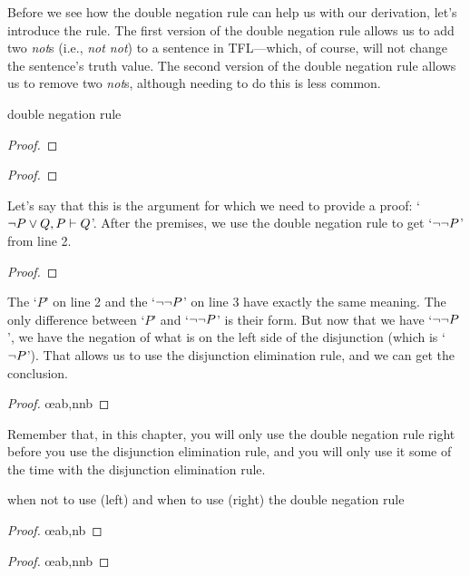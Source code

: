 Before we see how the double negation rule can help us with our derivation, let's introduce the rule. The first version of the double negation rule allows us to add two \textit{not}s (i.e., \textit{not not}) to a sentence in TFL---which, of course, will not change the sentence's truth value. The second version of the double negation rule allows us to remove two \textit{not}s, although needing to do this is less common. 

\begin{factboxy-width}[width=7.5cm]{double negation rule}
\begin{proof}
	 
\end{proof}

\begin{proof}
	 
\end{proof}
\end{factboxy-width}

Let's say that this is the argument for which we need to provide a proof: `${\neg} P \vee Q, P \vdash Q$'. After the premises, we use the double negation rule to get `${\neg} {\neg} P$' from line 2.

\begin{proof}
	 \pr{}
	 \pr{} 
	 
\end{proof}
The `$P$' on line 2 and the `${\neg} {\neg} P$' on line 3 have exactly the same meaning. The only difference between `$P$' and `${\neg} {\neg} P$' is their form. But now that we have `${\neg} {\neg} P$', we have the negation of what is on the left side of the disjunction (which is `${\neg} P$'). That allows us to use the disjunction elimination rule, and we can get the conclusion.

\begin{proof}
	 \pr{}
	 \pr{}
	 
	 \oe{ab,nnb}
\end{proof}

Remember that, in this chapter, you will only use the double negation rule right before you use the disjunction elimination rule, and you will only use it some of the time with the disjunction elimination rule.

\begin{factboxy-side}{when not to use (left) and when to use (right) the double negation rule}
\begin{proof}
	 \oe{ab,nb}
\end{proof}
\tcblower
\begin{proof}
	 
	 \oe{ab,nnb}
\end{proof}
\end{factboxy-side}


